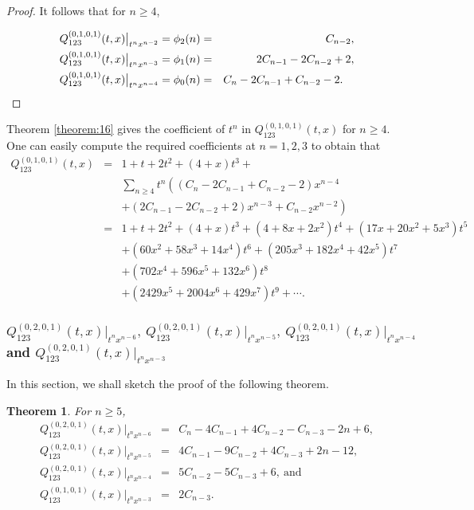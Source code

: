 \documentclass[
final,nomarks
]{dmtcs-episciences}
\newtheorem{theorem}{Theorem}
\newcommand{\tref}[1]{Theorem \ref{theorem:#1}}
\newcommand{\Qm}[1]{Q_{123}^{(#1)}(t,x)}
\begin{document}
\begin{proof}
	It follows that for \begin{math}n \geq 4\end{math}, 
	
	\begin{eqnarray}
		\Qm{0,1,0,1}\big|_{t^n x^{n-2}}=\phi_2(n)&=&C_{n-2},\\
		\Qm{0,1,0,1}\big|_{t^n x^{n-3}}=\phi_1(n)&=&2C_{n-1}-2C_{n-2}+2,\\
		\Qm{0,1,0,1}\big|_{t^n x^{n-4}}=\phi_0(n)&=&C_n-2C_{n-1}+C_{n-2}-2.\ \ \  \qedhere
	\end{eqnarray}
\end{proof}
\tref{16} gives the coefficient of \begin{math}t^n\end{math} in \begin{math}\Qm{0,1,0,1}\end{math} for \begin{math}n\geq 4\end{math}. One can easily 
compute the required coefficients at \begin{math}n=1,2,3\end{math} to obtain that 
\begin{eqnarray}
	\Qm{0,1,0,1}&=&1+t+2t^2+(4+x)t^3+\nonumber\\\nonumber
	&&\sum_{n\geq 4}t^n\left((C_n-2C_{n-1}+C_{n-2}-2)x^{n-4}\right.\\\nonumber
	&&\left.+(2C_{n-1}-2C_{n-2}+2)x^{n-3}+C_{n-2}x^{n-2}\right)\\\nonumber
	&=&1+t+2 t^2+(4+x) t^3+\left(4+8 x+2 x^2\right) t^4+\left(17 x+20 x^2+5 x^3\right)
	t^5\\\nonumber
	&&+\left(60 x^2+58 x^3+14 x^4\right) t^6+\left(205 x^3+182 x^4+42
	x^5\right) t^7\\\nonumber
	&&+\left(702 x^4+596 x^5+132 x^6\right) t^8\\
	&&+\left(2429 x^5+2004
	x^6+429 x^7\right) t^9+\cdots .
\end{eqnarray}  

\subsubsection{\(\Qm{0,2,0,1}\big|_{t^n x^{n-6}},\ \Qm{0,2,0,1}\big|_{t^n x^{n-5}},\ \Qm{0,2,0,1}\big|_{t^n x^{n-4}}\) \\and \(\Qm{0,2,0,1}\big|_{t^n x^{n-3}}\)}
In this section, we shall sketch the proof of the following theorem. 

\begin{theorem}\label{theorem:17}
	For \begin{math}n\geq 5\end{math}, 
	\begin{eqnarray}
		\Qm{0,2,0,1}\big|_{t^n x^{n-6}}&=&C_n-4C_{n-1}+4C_{n-2}-C_{n-3}-2n+6, \\
		\Qm{0,2,0,1}\big|_{t^n x^{n-5}}&=& 4C_{n-1}-9C_{n-2}+4C_{n-3}+2n-12, \\
		\Qm{0,2,0,1}\big|_{t^n x^{n-4}}&=&5C_{n-2}-5C_{n-3}+6, \ \mbox{and} \\
		\Qm{0,1,0,1}\big|_{t^n x^{n-3}}&=&2C_{n-3}.
	\end{eqnarray}
\end{theorem}
\end{document}

